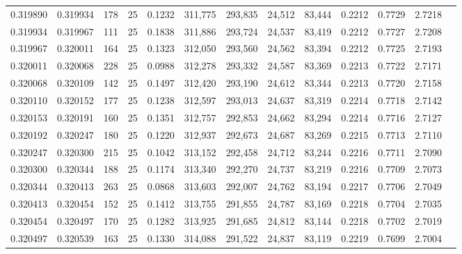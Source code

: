 \begin{tabular}{rrrrrrrrrrrrr}
0.319890 & 0.319934 &   178 &  25 &                                     0.1232 & 311,775 & 293,835 &  24,512 &  83,444 & 0.2212 & 0.7729 & 2.7218 \\
0.319934 & 0.319967 &   111 &  25 &                                     0.1838 & 311,886 & 293,724 &  24,537 &  83,419 & 0.2212 & 0.7727 & 2.7208 \\
0.319967 & 0.320011 &   164 &  25 &                                     0.1323 & 312,050 & 293,560 &  24,562 &  83,394 & 0.2212 & 0.7725 & 2.7193 \\
0.320011 & 0.320068 &   228 &  25 &                                     0.0988 & 312,278 & 293,332 &  24,587 &  83,369 & 0.2213 & 0.7722 & 2.7171 \\
0.320068 & 0.320109 &   142 &  25 &                                     0.1497 & 312,420 & 293,190 &  24,612 &  83,344 & 0.2213 & 0.7720 & 2.7158 \\
0.320110 & 0.320152 &   177 &  25 &                                     0.1238 & 312,597 & 293,013 &  24,637 &  83,319 & 0.2214 & 0.7718 & 2.7142 \\
0.320153 & 0.320191 &   160 &  25 &                                     0.1351 & 312,757 & 292,853 &  24,662 &  83,294 & 0.2214 & 0.7716 & 2.7127 \\
0.320192 & 0.320247 &   180 &  25 &                                     0.1220 & 312,937 & 292,673 &  24,687 &  83,269 & 0.2215 & 0.7713 & 2.7110 \\
0.320247 & 0.320300 &   215 &  25 &                                     0.1042 & 313,152 & 292,458 &  24,712 &  83,244 & 0.2216 & 0.7711 & 2.7090 \\
0.320300 & 0.320344 &   188 &  25 &                                     0.1174 & 313,340 & 292,270 &  24,737 &  83,219 & 0.2216 & 0.7709 & 2.7073 \\
0.320344 & 0.320413 &   263 &  25 &                                     0.0868 & 313,603 & 292,007 &  24,762 &  83,194 & 0.2217 & 0.7706 & 2.7049 \\
0.320413 & 0.320454 &   152 &  25 &                                     0.1412 & 313,755 & 291,855 &  24,787 &  83,169 & 0.2218 & 0.7704 & 2.7035 \\
0.320454 & 0.320497 &   170 &  25 &                                     0.1282 & 313,925 & 291,685 &  24,812 &  83,144 & 0.2218 & 0.7702 & 2.7019 \\
0.320497 & 0.320539 &   163 &  25 &                                     0.1330 & 314,088 & 291,522 &  24,837 &  83,119 & 0.2219 & 0.7699 & 2.7004 \\

\end{tabular}
